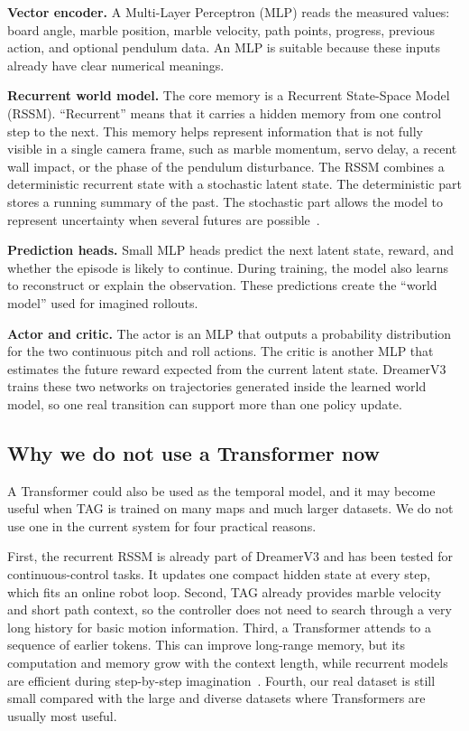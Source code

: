 \documentclass[9pt]{extarticle}
\begin{document}
\textbf{Vector encoder.} A Multi-Layer Perceptron (MLP) reads the measured values: board angle, marble position, marble velocity, path points, progress, previous action, and optional pendulum data. An MLP is suitable because these inputs already have clear numerical meanings.

\textbf{Recurrent world model.} The core memory is a Recurrent State-Space Model (RSSM). ``Recurrent'' means that it carries a hidden memory from one control step to the next. This memory helps represent information that is not fully visible in a single camera frame, such as marble momentum, servo delay, a recent wall impact, or the phase of the pendulum disturbance. The RSSM combines a deterministic recurrent state with a stochastic latent state. The deterministic part stores a running summary of the past. The stochastic part allows the model to represent uncertainty when several futures are possible~\cite{hafner2025dreamerv3}.

\textbf{Prediction heads.} Small MLP heads predict the next latent state, reward, and whether the episode is likely to continue. During training, the model also learns to reconstruct or explain the observation. These predictions create the ``world model'' used for imagined rollouts.

\textbf{Actor and critic.} The actor is an MLP that outputs a probability distribution for the two continuous pitch and roll actions. The critic is another MLP that estimates the future reward expected from the current latent state. DreamerV3 trains these two networks on trajectories generated inside the learned world model, so one real transition can support more than one policy update.

\subsection{Why we do not use a Transformer now}
A Transformer could also be used as the temporal model, and it may become useful when TAG is trained on many maps and much larger datasets. We do not use one in the current system for four practical reasons.

First, the recurrent RSSM is already part of DreamerV3 and has been tested for continuous-control tasks. It updates one compact hidden state at every step, which fits an online robot loop. Second, TAG already provides marble velocity and short path context, so the controller does not need to search through a very long history for basic motion information. Third, a Transformer attends to a sequence of earlier tokens. This can improve long-range memory, but its computation and memory grow with the context length, while recurrent models are efficient during step-by-step imagination~\cite{deng2023backbones}. Fourth, our real dataset is still small compared with the large and diverse datasets where Transformers are usually most useful.
\end{document}
